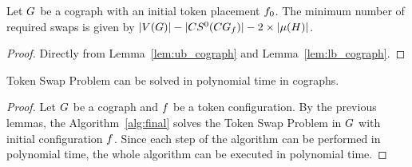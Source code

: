 \documentclass[msc,english,table,xcdraw]{ppgccufmg}
\begin{document}


\begin{theorem}
\label{cor:cograph_pol}
Let $G$ be a cograph with an initial token placement $f_{0}$.
The minimum number of required swaps is given by $|V(G)| - 
|CS^{0}(CG_{f})| - 2\times|\mu(H)|$.
\end{theorem}

\begin{proof}
Directly from Lemma~\ref{lem:ub_cograph} and Lemma~\ref{lem:lb_cograph}.
\end{proof}




\begin{theorem}
Token Swap Problem can be solved in polynomial time in cographs.
\end{theorem}

\begin{proof}
Let $G$ be a cograph and $f$ be a token configuration. By the previous lemmas, the Algorithm~\ref{alg:final} solves the Token Swap Problem in $G$ with initial configuration $f$.
Since each step of the algorithm can be performed in polynomial time, the whole algorithm can be executed in polynomial time.
\end{proof}
\end{document}
